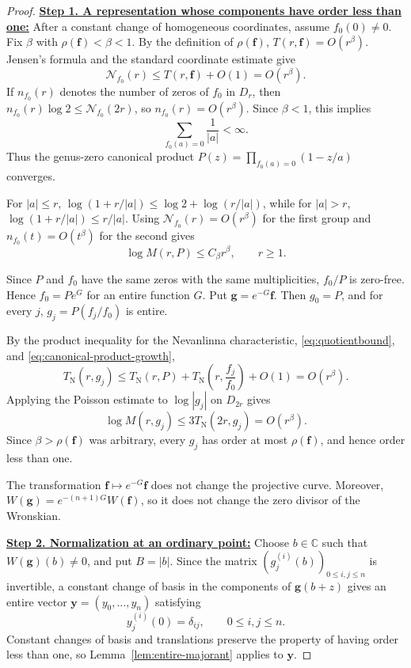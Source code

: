 \documentclass[12pt,letterpaper,reqno]{amsart}
\theoremstyle{definition}
\numberwithin{equation}{section}
\newcommand{\C}{\mathbb C}
\newcommand{\NN}{\mathcal N}
\newcommand{\TN}{T_{\mathrm N}}
\newcommand{\fv}{\bm f}
\newcommand{\gv}{\bm g}
\newcommand{\yv}{\bm y}
\begin{document}
\begin{proof}

\medskip\noindent
\textbf{\underline{Step 1. A representation whose components have order less than one:}}
After a constant change of homogeneous coordinates, assume
\(f_0(0)\ne0\). Fix
\(\beta\) with \(\rho(\fv)<\beta<1\). By the definition of
\(\rho(\fv)\), \(T(r,\fv)=O(r^\beta)\). Jensen's formula and the
standard coordinate estimate give
\[
 \NN_{f_0}(r)
 \leq
 T(r,\fv)+O(1)
 =
 O(r^\beta).
\]
If \(n_{f_0}(r)\) denotes the number of zeros of \(f_0\) in \(D_r\),
then
\(n_{f_0}(r)\log2\leq\NN_{f_0}(2r)\), so
\(n_{f_0}(r)=O(r^\beta)\). Since \(\beta<1\), this implies
\[
 \sum_{f_0(a)=0}\frac1{|a|}<\infty.
\]
Thus the genus-zero canonical product
\(P(z)=\prod_{f_0(a)=0}(1-z/a)\) converges.

For \(|a|\leq r\),
\(\log(1+r/|a|)
 \leq\log2+\log(r/|a|)\), while for \(|a|>r\),
\(\log(1+r/|a|)\leq r/|a|\). Using
\(\NN_{f_0}(r)=O(r^\beta)\) for the first group and
\(n_{f_0}(t)=O(t^\beta)\) for the second gives
\begin{equation}\label{eq:canonical-product-growth}
 \log M(r,P)\leq C_\beta r^\beta,
 \qquad
 r\geq1.
\end{equation}

Since \(P\) and \(f_0\) have the same zeros with the same
multiplicities, \(f_0/P\) is zero-free. Hence
\(f_0=Pe^G\) for an entire function \(G\). Put
\(\gv=e^{-G}\fv\). Then \(g_0=P\), and for every \(j\),
\(g_j=P(f_j/f_0)\) is entire.

By the product inequality for the Nevanlinna characteristic,
\eqref{eq:quotientbound}, and \eqref{eq:canonical-product-growth},
\[
 \TN(r,g_j)
 \leq
 \TN(r,P)
 +
 \TN\left(r,\frac{f_j}{f_0}\right)
 +O(1)
 =
 O(r^\beta).
\]
Applying the Poisson estimate to \(\log|g_j|\) on \(D_{2r}\) gives
\begin{equation}\label{eq:gauge-component-growth}
 \log M(r,g_j)
 \leq
 3\TN(2r,g_j)
 =
 O(r^\beta).
\end{equation}
Since \(\beta>\rho(\fv)\) was arbitrary, every \(g_j\) has order at
most \(\rho(\fv)\), and hence order less than one.

The transformation \(\fv\mapsto e^{-G}\fv\) does not change the
projective curve. Moreover,
\(W(\gv)=e^{-(n+1)G}W(\fv)\), so it does not change the zero divisor of
the Wronskian.


\medskip\noindent
\textbf{\underline{Step 2. Normalization at an ordinary point:}}
Choose \(b\in\C\) such that \(W(\gv)(b)\ne0\), and put \(B=|b|\).
Since the matrix
\((g_j^{(i)}(b))_{0\leq i,j\leq n}\) is invertible, a constant
change of basis in the components of \(\gv(b+z)\) gives an entire
vector
\(\yv=(y_0,\ldots,y_{n})\) satisfying
\[
 y_j^{(i)}(0)=\delta_{ij},
 \qquad
 0\leq i,j\leq n.
\]
Constant changes of basis and translations preserve the property of
having order less than one, so Lemma~\ref{lem:entire-majorant} applies
to \(\yv\).


\end{proof}
\end{document}
